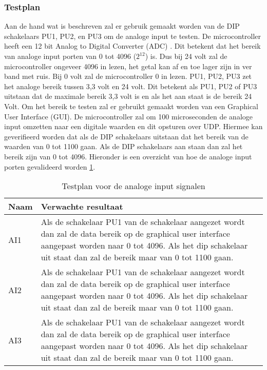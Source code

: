 \subsubsection{Testplan}
Aan de hand wat is beschreven zal er gebruik gemaakt worden van de DIP schakelaars PU1, PU2, en PU3 om de analoge input te testen. De microcontroller heeft een 12 bit Analog to Digital Converter (ADC) \autocite{microcontroller}. Dit betekent dat het bereik van analoge input porten van 0 tot 4096 ($2^{12}$) is. Dus bij 24 volt zal de microcontroller ongeveer 4096 in lezen, het getal kan af en toe lager zijn in ver band met ruis. Bij 0 volt zal de microcontroller 0 in lezen. PU1, PU2, PU3 zet het analoge bereik tussen 3,3 volt en 24 volt. Dit betekent als PU1, PU2 of PU3 uitstaan dat de maximale bereik 3,3 volt is en als het aan staat is de bereik 24 Volt. Om het bereik te testen zal er gebruikt gemaakt worden van een Graphical User Interface (GUI). De microcontroller zal om 100 microseconden de analoge input omzetten naar een digitale waarden en dit opsturen over UDP. Hiermee kan geverifieerd worden dat als de DIP schakelaars uitstaan dat het bereik van de waarden van 0 tot 1100 gaan. Als de DIP schakelaars aan staan dan zal het bereik zijn van 0 tot 4096. Hieronder is een overzicht van hoe de analoge input porten gevalideerd worden \ref{tab:hw_val_ai_testplan}.
\begin{table}[h!]
	\caption{Testplan voor de analoge input signalen}
	\begin{tabular}{lp{14.5cm}}
	\toprule
	\textbf{Naam} 	& \textbf{Verwachte resultaat} \\ \toprule
	AI1			& Als de schakelaar PU1 van de schakelaar aangezet wordt dan zal de data bereik op de graphical user interface aangepast worden naar 0 tot 4096. Als het dip schakelaar uit staat dan zal de bereik maar van 0 tot 1100 gaan.\\
	AI2			& Als de schakelaar PU1 van de schakelaar aangezet wordt dan zal de data bereik op de graphical user interface aangepast worden naar 0 tot 4096. Als het dip schakelaar uit staat dan zal de bereik maar van 0 tot 1100 gaan.\\
	AI3			& Als de schakelaar PU1 van de schakelaar aangezet wordt dan zal de data bereik op de graphical user interface aangepast worden naar 0 tot 4096. Als het dip schakelaar uit staat dan zal de bereik maar van 0 tot 1100 gaan.\\  \bottomrule
	\end{tabular}
	\label{tab:hw_val_ai_testplan}
\end{table}


